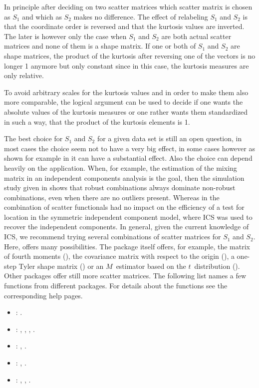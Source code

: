 \documentclass[article,nojss]{jss}
\begin{document}
In principle after deciding on two scatter matrices which scatter matrix is chosen as $S_1$ and which as $S_2$ makes no difference. The effect of relabeling $S_1$ and $S_2$ is that the coordinate order 
is reversed and that the kurtosis values are inverted.
The later is however only the case when $S_1$ and $S_2$ are both actual scatter matrices and none of them is a shape matrix. If one or both of $S_1$ and $S_2$ are shape matrices, the product of the 
kurtosis after reversing one
of the vectors is no longer 1 anymore but only constant since in this case, the kurtosis measures are only relative.

To avoid arbitrary scales for the kurtosis values and in order to make them also more comparable, the logical argument  can be used to decide if one wants the absolute values
of the kurtosis measures or one rather wants them standardized in such a way, that the product of the kurtosis elements is 1.

The best choice for $S_1$ and $S_2$ for a given data set is still an
open question, in most cases the choice seem not to have a very big
effect, in some cases however as shown for example in
\citet{Tyler2008} it can have a substantial effect.
Also the choice can depend heavily on the application. When, for example, the estimation of the mixing matrix in an independent components analysis is
the goal, then the simulation study given in \citet{NordhausenOjaOllila2008} shows that robust combinations always dominate non-robust combinations, even when there are no
outliers present. Whereas in \citet{NordhausenOjaPaindaveine2008} the combination of scatter functionals had no impact on the efficiency of a test for location in the symmetric independent component
model, where ICS was used to recover the independent components.
 In general, given the current knowledge of {ICS}, we recommend
trying several combinations of scatter matrices for $S_1$ and $S_2$.
Here,  offers many possibilities. The package  itself
offers, for example, the matrix of fourth moments (), the covariance
matrix with respect to the origin (), a one-step Tyler shape %
matrix () or an $M$~estimator based on the
$t$~distribution (). Other packages offer still
more scatter matrices. The following list names a few functions
from different packages. For details about the functions see the
corresponding help pages.

\begin{itemize}
  \item {} \citep{covRobust}:
        .
  \item {} \citep{ICSNP2007}:
         , , , .
  \item {} \citep{MASS2002}:
        , .
  \item {} \citep{robustbase2008}:
        , .
  \item {} \citep{rrcov}:
        , , .
\end{itemize}
\end{document}
